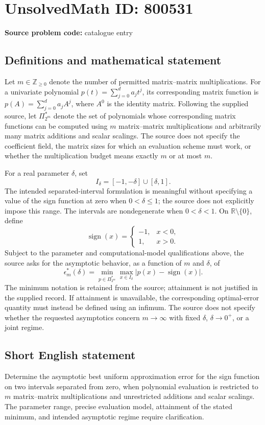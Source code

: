 \documentclass[11pt]{article}
\newcommand{\Z}{\mathbb{Z}}
\newcommand{\R}{\mathbb{R}}
\begin{document}
\section*{UnsolvedMath ID: 800531}
\textbf{Source problem code:} catalogue entry
\subsection{Definitions and mathematical statement}
Let \(m\in\Z_{\ge 0}\) denote the number of permitted matrix--matrix multiplications. For a univariate polynomial \(p(t)=\sum_{j=0}^{d}a_jt^j\), its corresponding matrix function is \(p(A)=\sum_{j=0}^{d}a_jA^j\), where \(A^0\) is the identity matrix. Following the supplied source, let \(\Pi_{2^m}^{*}\) denote the set of polynomials whose corresponding matrix functions can be computed using \(m\) matrix--matrix multiplications and arbitrarily many matrix additions and scalar scalings. The source does not specify the coefficient field, the matrix sizes for which an evaluation scheme must work, or whether the multiplication budget means exactly \(m\) or at most \(m\).

For a real parameter \(\delta\), set
\[
I_\delta=[-1,-\delta]\cup[\delta,1].
\]
The intended separated-interval formulation is meaningful without specifying a value of the sign function at zero when \(0<\delta\le 1\); the source does not explicitly impose this range. The intervals are nondegenerate when \(0<\delta<1\). On \(\R\setminus\{0\}\), define
\[
\operatorname{sign}(x)=
\begin{cases}
-1,&x<0,\\
1,&x>0.
\end{cases}
\]
Subject to the parameter and computational-model qualifications above, the source asks for the asymptotic behavior, as a function of \(m\) and \(\delta\), of
\[
\epsilon_m^{*}(\delta)
=
\min_{p\in\Pi_{2^m}^{*}}
\max_{x\in I_\delta}
\left|p(x)-\operatorname{sign}(x)\right|.
\]
The minimum notation is retained from the source; attainment is not justified in the supplied record. If attainment is unavailable, the corresponding optimal-error quantity must instead be defined using an infimum. The source does not specify whether the requested asymptotics concern \(m\to\infty\) with fixed \(\delta\), \(\delta\to0^{+}\), or a joint regime.
\subsection{Short English statement}
Determine the asymptotic best uniform approximation error for the sign function on two intervals separated from zero, when polynomial evaluation is restricted to \(m\) matrix--matrix multiplications and unrestricted additions and scalar scalings. The parameter range, precise evaluation model, attainment of the stated minimum, and intended asymptotic regime require clarification.
\end{document}
